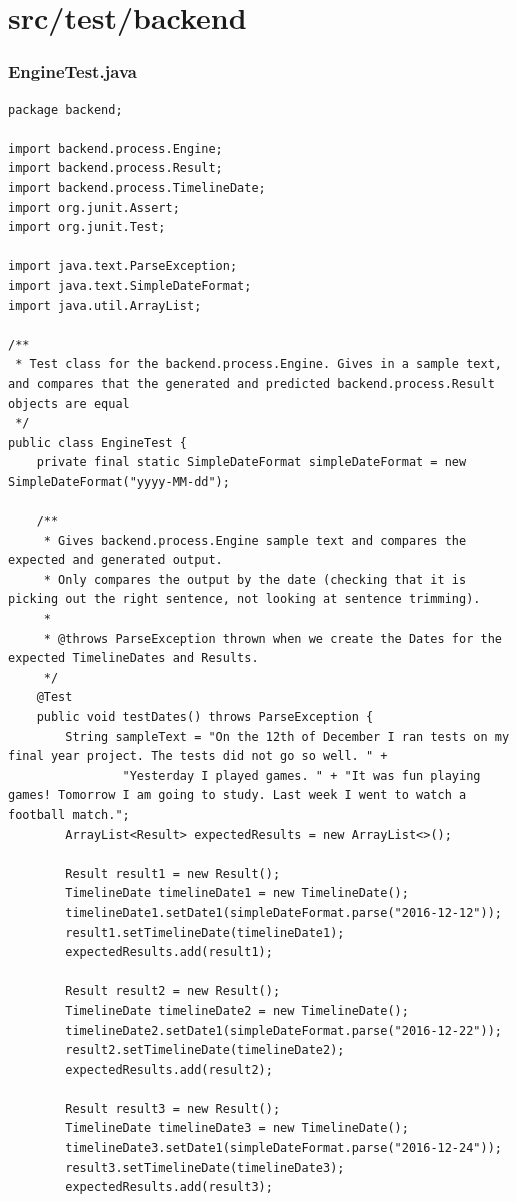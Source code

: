 \section{src/test/backend}
\subsubsection{EngineTest.java}
\begin{lstlisting}
package backend;

import backend.process.Engine;
import backend.process.Result;
import backend.process.TimelineDate;
import org.junit.Assert;
import org.junit.Test;

import java.text.ParseException;
import java.text.SimpleDateFormat;
import java.util.ArrayList;

/**
 * Test class for the backend.process.Engine. Gives in a sample text, and compares that the generated and predicted backend.process.Result objects are equal
 */
public class EngineTest {
    private final static SimpleDateFormat simpleDateFormat = new SimpleDateFormat("yyyy-MM-dd");

    /**
     * Gives backend.process.Engine sample text and compares the expected and generated output.
     * Only compares the output by the date (checking that it is picking out the right sentence, not looking at sentence trimming).
     *
     * @throws ParseException thrown when we create the Dates for the expected TimelineDates and Results.
     */
    @Test
    public void testDates() throws ParseException {
        String sampleText = "On the 12th of December I ran tests on my final year project. The tests did not go so well. " +
                "Yesterday I played games. " + "It was fun playing games! Tomorrow I am going to study. Last week I went to watch a football match.";
        ArrayList<Result> expectedResults = new ArrayList<>();

        Result result1 = new Result();
        TimelineDate timelineDate1 = new TimelineDate();
        timelineDate1.setDate1(simpleDateFormat.parse("2016-12-12"));
        result1.setTimelineDate(timelineDate1);
        expectedResults.add(result1);

        Result result2 = new Result();
        TimelineDate timelineDate2 = new TimelineDate();
        timelineDate2.setDate1(simpleDateFormat.parse("2016-12-22"));
        result2.setTimelineDate(timelineDate2);
        expectedResults.add(result2);

        Result result3 = new Result();
        TimelineDate timelineDate3 = new TimelineDate();
        timelineDate3.setDate1(simpleDateFormat.parse("2016-12-24"));
        result3.setTimelineDate(timelineDate3);
        expectedResults.add(result3);


\end{lstlisting}
